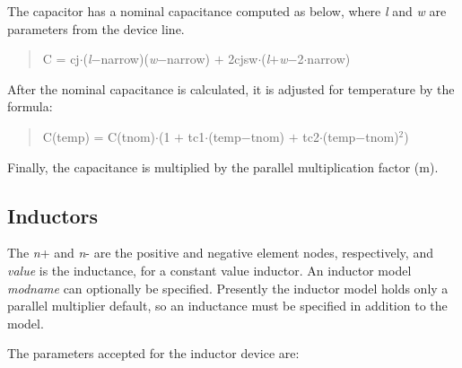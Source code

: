The capacitor has a nominal capacitance computed as below, where {\it
l} and {\it w} are parameters from the device line.
\begin{quote}
C = {\vt cj}$\cdot$({\it l\/}$-${\vt narrow})({\it w\/}$-${\vt narrow}) $+$
  2{\vt cjsw}$\cdot$({\it l\/}$+${\it w\/}$-$2$\cdot${\vt narrow})
\end{quote}

After the nominal capacitance is calculated, it is adjusted for
temperature by the formula:
\begin{quote}
C{\vt (temp)} = C{\vt (tnom)}$\cdot${\vt (1 $+$ tc1$\cdot$(temp$-$tnom) $+$
 tc2$\cdot$(temp$-$tnom)$^2$)}
\end{quote}

Finally, the capacitance is multiplied by the parallel 
multiplication factor ({\vt m}).

\subsection{Inductors}




The {\it n\/}{\vt +} and {\it n\/}{\vt -} are the positive and
negative element nodes, respectively, and {\it value} is the
inductance, for a constant value inductor.  An inductor model {\it
modname} can optionally be specified.  Presently the inductor model
holds only a parallel multiplier default, so an inductance must be
specified in addition to the model.

The parameters accepted for the inductor device are:

